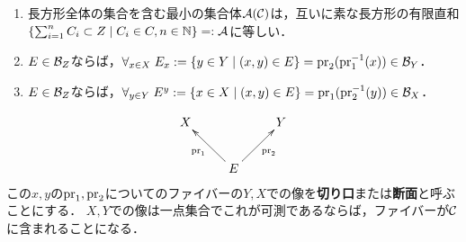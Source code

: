 \documentclass[uplatex, dvipdfmx]{jsreport}
\begin{document}
\begin{lemma}[矩形集合の有限直和は集合体]\mbox{}\label{lemma-finite-sum-of-rectangles}
    \begin{enumerate}
        \item 長方形全体の集合を含む最小の集合体$\mathcal{A}(\mathcal{C})$は，互いに素な長方形の有限直和$\left\{\sum_{i=1}^nC_i\subset Z\;\middle|\;C_i\in C,n\in\mathbb{N}\right\}=:\mathcal{A}$に等しい．
        \item $E\in\mathcal{B}_Z$ならば，$\forall_{x\in X}\;E_x:=\{y\in Y\mid (x,y)\in E\}=\mathrm{pr}_2(\mathrm{pr}_1^{-1}(x))\in\mathcal{B}_Y$．
        \item $E\in\mathcal{B}_Z$ならば，$\forall_{y\in Y}\;E^y:=\{x\in X\mid (x,y)\in E\}=\mathrm{pr}_1(\mathrm{pr}_2^{-1}(y))\in\mathcal{B}_X$．
    \end{enumerate}
    \[\xymatrix{
        X&&Y\\
        &E\ar[ul]^-{\pr_1}\ar[ur]_-{\pr_2}
    }\]
    この$x,y$の$\mathrm{pr}_1,\mathrm{pr}_2$についてのファイバーの$Y,X$での像を\textbf{切り口}または\textbf{断面}と呼ぶことにする．
    $X,Y$での像は一点集合でこれが可測であるならば，ファイバーが$\mathcal{C}$に含まれることになる．
\end{lemma}
\end{document}
